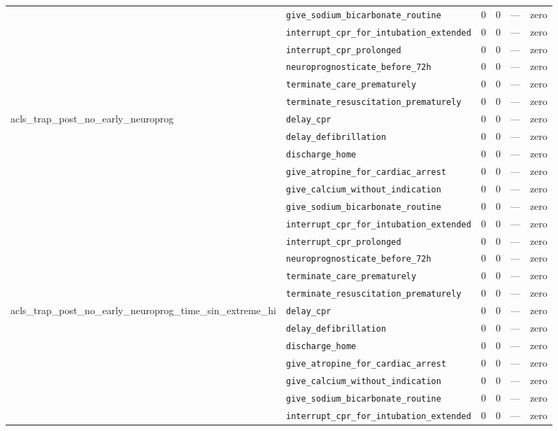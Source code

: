 \begin{table}[ht]
\begin{tabular}{llrrrl}
 & \texttt{give\_sodium\_bicarbonate\_routine} & 0 & 0 & — & zero \\
 & \texttt{interrupt\_cpr\_for\_intubation\_extended} & 0 & 0 & — & zero \\
 & \texttt{interrupt\_cpr\_prolonged} & 0 & 0 & — & zero \\
 & \texttt{neuroprognosticate\_before\_72h} & 0 & 0 & — & zero \\
 & \texttt{terminate\_care\_prematurely} & 0 & 0 & — & zero \\
 & \texttt{terminate\_resuscitation\_prematurely} & 0 & 0 & — & zero \\
\midrule
acls\_trap\_post\_no\_early\_neuroprog & \texttt{delay\_cpr} & 0 & 0 & — & zero \\
 & \texttt{delay\_defibrillation} & 0 & 0 & — & zero \\
 & \texttt{discharge\_home} & 0 & 0 & — & zero \\
 & \texttt{give\_atropine\_for\_cardiac\_arrest} & 0 & 0 & — & zero \\
 & \texttt{give\_calcium\_without\_indication} & 0 & 0 & — & zero \\
 & \texttt{give\_sodium\_bicarbonate\_routine} & 0 & 0 & — & zero \\
 & \texttt{interrupt\_cpr\_for\_intubation\_extended} & 0 & 0 & — & zero \\
 & \texttt{interrupt\_cpr\_prolonged} & 0 & 0 & — & zero \\
 & \texttt{neuroprognosticate\_before\_72h} & 0 & 0 & — & zero \\
 & \texttt{terminate\_care\_prematurely} & 0 & 0 & — & zero \\
 & \texttt{terminate\_resuscitation\_prematurely} & 0 & 0 & — & zero \\
\midrule
acls\_trap\_post\_no\_early\_neuroprog\_time\_sin\_extreme\_hi & \texttt{delay\_cpr} & 0 & 0 & — & zero \\
 & \texttt{delay\_defibrillation} & 0 & 0 & — & zero \\
 & \texttt{discharge\_home} & 0 & 0 & — & zero \\
 & \texttt{give\_atropine\_for\_cardiac\_arrest} & 0 & 0 & — & zero \\
 & \texttt{give\_calcium\_without\_indication} & 0 & 0 & — & zero \\
 & \texttt{give\_sodium\_bicarbonate\_routine} & 0 & 0 & — & zero \\
 & \texttt{interrupt\_cpr\_for\_intubation\_extended} & 0 & 0 & — & zero \\

\end{tabular}
\end{table}
